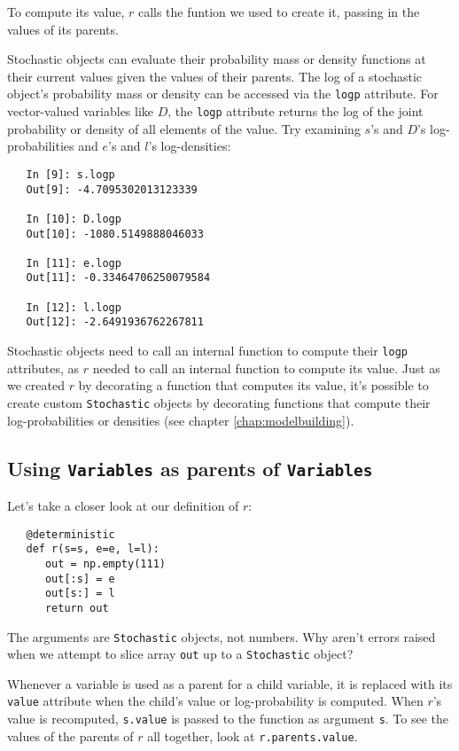 To compute its value, $r$ calls the funtion we used to create it, passing in the values of its parents.

Stochastic objects can evaluate their probability mass or density functions at their current values given the values of their parents. The log of a stochastic object's probability mass or density can be accessed via the \texttt{logp} attribute. For vector-valued variables like $D$, the \texttt{logp} attribute returns the log of the joint probability or density of all elements of the value. Try examining $s$'s and $D$'s log-probabilities and $e$'s and $l$'s log-densities:
\begin{verbatim}
   In [9]: s.logp
   Out[9]: -4.7095302013123339

   In [10]: D.logp
   Out[10]: -1080.5149888046033

   In [11]: e.logp
   Out[11]: -0.33464706250079584

   In [12]: l.logp
   Out[12]: -2.6491936762267811
\end{verbatim}
Stochastic objects need to call an internal function to compute their \texttt{logp} attributes, as $r$ needed to call an internal function to compute its value. Just as we created $r$ by decorating a function that computes its value, it's possible to create custom \texttt{Stochastic} objects by decorating functions that compute their log-probabilities or densities (see chapter \ref{chap:modelbuilding}). 

\subsection*{Using \texttt{Variables} as parents of \texttt{Variables}}

Let's take a closer look at our definition of $r$:
\begin{verbatim}
   @deterministic
   def r(s=s, e=e, l=l):
      out = np.empty(111)
      out[:s] = e
      out[s:] = l
      return out
\end{verbatim}
The arguments are \texttt{Stochastic} objects, not numbers. Why aren't errors raised when we attempt to slice array \texttt{out} up to a \texttt{Stochastic} object?

Whenever a variable is used as a parent for a child variable, it is replaced with its \texttt{value} attribute when the child's value or log-probability is computed. When $r$'s value is recomputed, \texttt{s.value} is passed to the function as argument \texttt{s}. To see the values of the parents of $r$ all together, look at \texttt{r.parents.value}.


